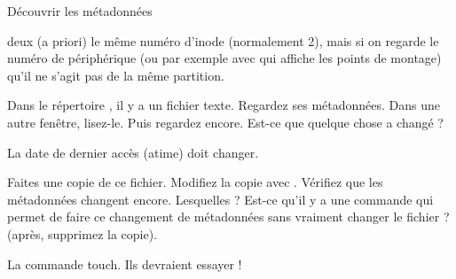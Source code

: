 \begin{exercice}
\begin{exercicelet}{Découvrir les métadonnées}
\begin{questions}
\begin{correction}
        deux (a priori) le même numéro d'inode (normalement 2), mais si
        on regarde le numéro de périphérique (ou par exemple avec
         qui affiche les points de
        montage) qu'il ne s'agit pas de la même partition.
      \end{correction}
    \item Dans le répertoire , il y a un
      fichier texte. Regardez ses métadonnées. Dans une autre fenêtre,
      lisez-le. Puis regardez encore. Est-ce que quelque chose a changé ?
      \begin{correction}
        La date de dernier accès (atime) doit changer.
      \end{correction}
    \item Faites une copie de ce fichier. Modifiez la copie avec
      . Vérifiez que les métadonnées changent
      encore. Lesquelles ? Est-ce qu'il y a une commande qui permet de
      faire ce changement de métadonnées sans vraiment changer le
      fichier ? (après, supprimez la copie).
      \begin{correction}
        La commande touch. Ils devraient essayer !
      \end{correction}
    \end{questions}
  \end{exercicelet}
\end{exercice}

